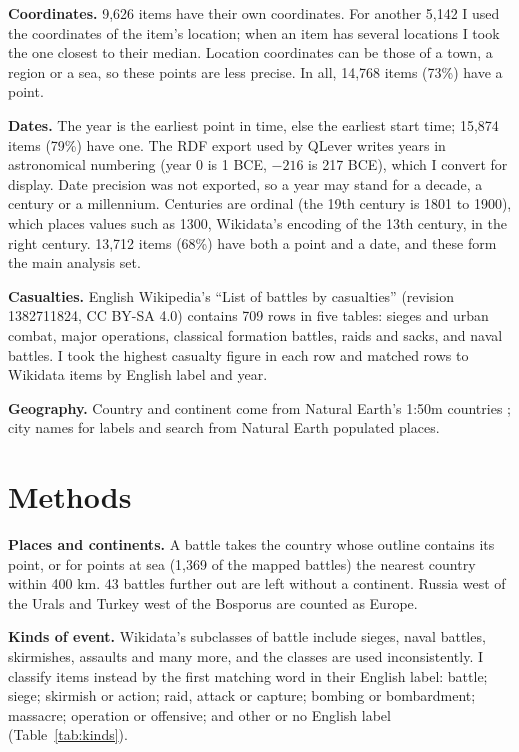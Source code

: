 \documentclass[11pt,a4paper]{article}
\begin{document}
\textbf{Coordinates.} 9,626 items have their own coordinates. For another 5,142 I used the coordinates of the item's location; when an item has several locations I took the one closest to their median. Location coordinates can be those of a town, a region or a sea, so these points are less precise. In all, 14,768 items (73\%) have a point.

\textbf{Dates.} The year is the earliest point in time, else the earliest start time; 15,874 items (79\%) have one. The RDF export used by QLever writes years in astronomical numbering (year 0 is 1 BCE, $-216$ is 217 BCE), which I convert for display. Date precision was not exported, so a year may stand for a decade, a century or a millennium. Centuries are ordinal (the 19th century is 1801 to 1900), which places values such as 1300, Wikidata's encoding of the 13th century, in the right century. 13,712 items (68\%) have both a point and a date, and these form the main analysis set.

\textbf{Casualties.} English Wikipedia's ``List of battles by casualties'' (revision 1382711824, CC BY-SA 4.0) contains 709 rows in five tables: sieges and urban combat, major operations, classical formation battles, raids and sacks, and naval battles. I took the highest casualty figure in each row and matched rows to Wikidata items by English label and year.

\textbf{Geography.} Country and continent come from Natural Earth's 1:50m countries \citep{naturalearth}; city names for labels and search from Natural Earth populated places.

\section{Methods}
\textbf{Places and continents.} A battle takes the country whose outline contains its point, or for points at sea (1,369 of the mapped battles) the nearest country within 400 km. 43 battles further out are left without a continent. Russia west of the Urals and Turkey west of the Bosporus are counted as Europe.

\textbf{Kinds of event.} Wikidata's subclasses of battle include sieges, naval battles, skirmishes, assaults and many more, and the classes are used inconsistently. I classify items instead by the first matching word in their English label: battle; siege; skirmish or action; raid, attack or capture; bombing or bombardment; massacre; operation or offensive; and other or no English label (Table~\ref{tab:kinds}).
\end{document}

